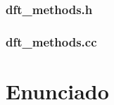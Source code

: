 \documentclass{article}
\begin{document}
    \subsubsection{dft\_methods.h}
      
    \subsubsection{dft\_methods.cc}
      




%    

\section{Enunciado}
\end{document}
